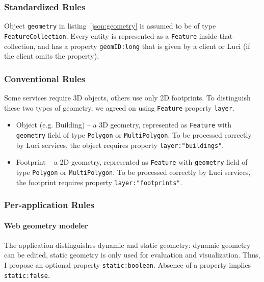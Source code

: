 \subsubsection{Standardized Rules}
\label{ch:scenarios:standardrules}
Object \texttt{geometry} in listing~\ref{json:geometry} is assumed to be of type \texttt{FeatureCollection}.
Every entity is represented as a \texttt{Feature} inside that collection, and has a property \texttt{geomID:\color{blue}long} that is given by a client or \ac{Luci} (if the client omits the property).

\subsubsection{Conventional Rules}
\label{ch:scenarios:conventionalrules}

Some services require 3D objects, others use only 2D footprints.
To distinguish these two types of geometry, we agreed on using \texttt{Feature} property \texttt{layer}.
\begin{itemize}
\item Object (e.g. Building) -- a 3D geometry, represented as \texttt{Feature} with \texttt{geometry} field of type \texttt{Polygon} or \texttt{MultiPolygon}.
To be processed correctly by \ac{Luci} services, the object requires property \texttt{layer:\color{red}"buildings"}.
%
\item Footprint -- a 2D geometry, represented as \texttt{Feature} with \texttt{geometry}
field of type \texttt{Polygon} or \texttt{MultiPolygon}.
To be processed correctly by \ac{Luci} services, the footprint requires property \texttt{layer:\color{red}"footprints"}.
\end{itemize}


\subsubsection{Per-application Rules}
\label{ch:scenarios:applicationrules}

\paragraph{Web geometry modeler}
The application distinguishes dynamic and static geometry:
dynamic geometry can be edited, static geometry is only used for evaluation and visualization.
Thus, I propose an optional property \texttt{static:\color{blue}boolean}.
Absence of a property implies \texttt{static:\color{brown}false}.

